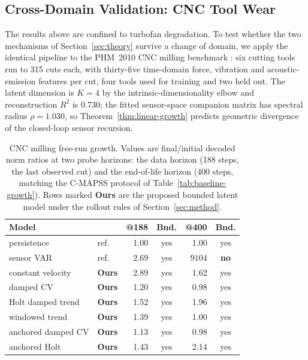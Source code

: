 \documentclass[a4paper,fleqn]{cas-sc}
\newcommand{\tinytable}{\scriptsize}
\newcommand{\verytighttables}{%
  \setlength{\tabcolsep}{3.5pt}%
  \renewcommand{\arraystretch}{1.05}%
}
\begin{document}
\subsection{Cross-Domain Validation: CNC Tool Wear}
\label{sec:milling}

The results above are confined to turbofan degradation. To test whether the two
mechanisms of Section~\ref{sec:theory} survive a change of domain, we apply the
identical pipeline to the PHM~2010 CNC milling benchmark \citep{phm2010}: six
cutting tools run
to 315 cuts each, with thirty-five time-domain force, vibration and
acoustic-emission features per cut, four tools used for training and two held
out. The latent dimension is $K{=}4$ by the intrinsic-dimensionality elbow and
reconstruction $R^2$ is $0.730$; the fitted sensor-space companion matrix has
spectral radius $\rho=1.030$, so Theorem~\ref{thm:linear-growth} predicts
geometric divergence of the closed-loop sensor recursion.

\begin{table}[t]
\centering
\caption{CNC milling free-run growth. Values are final/initial decoded norm
ratios at two probe horizons: the data horizon (188 steps, the last observed
cut) and the end-of-life horizon (400 steps, matching the C-MAPSS protocol of
Table~\ref{tab:baseline-growth}). Rows marked \textbf{Ours} are the proposed
bounded latent model under the rollout rules of Section~\ref{sec:method}.}
\label{tab:milling-growth}
\tinytable
\verytighttables
\begin{tabular}{@{}llrcrc@{}}
\toprule
Model & & @188 & Bnd. & @400 & Bnd. \\
\midrule
persistence        & ref.            & 1.00 & yes & 1.00      & yes \\
sensor VAR         & ref.            & 2.69 & yes & $9104$    & \textbf{no} \\
\midrule
constant velocity  & \textbf{Ours} & 2.89 & yes & 1.62      & yes \\
damped CV          & \textbf{Ours} & 1.20 & yes & 0.98      & yes \\
Holt damped trend  & \textbf{Ours} & 1.52 & yes & 1.96      & yes \\
windowed trend     & \textbf{Ours} & 1.39 & yes & 1.00      & yes \\
anchored damped CV & \textbf{Ours} & 1.13 & yes & 0.98      & yes \\
anchored Holt      & \textbf{Ours} & 1.43 & yes & 2.14      & yes \\
\bottomrule
\end{tabular}
\end{table}
\end{document}
